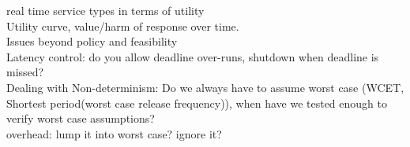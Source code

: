 \documentclass{article}
\begin{document}
real time service types in terms of utility\\
Utility curve, value/harm of response over time.\\

Issues beyond policy and feasibility\\
Latency control: do you allow deadline over-runs, shutdown when deadline is missed?\\
Dealing with Non-determinism: Do we always have to assume worst case (WCET, Shortest period(worst case release frequency)), when have we tested enough to verify worst case assumptions?\\
overhead: lump it into worst case? ignore it?\\
\end{document}
